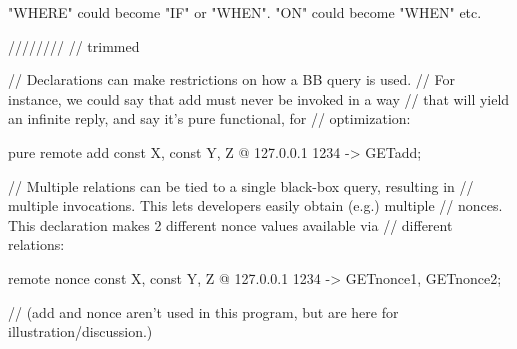"WHERE" could become "IF" or "WHEN".
"ON" could become "WHEN" 
etc.



////////
// trimmed


  // Declarations can make restrictions on how a BB query is used. 
  // For instance, we could say that add must never be invoked in a way
  // that will yield an infinite reply, and say it's pure functional, for 
  // optimization:

  pure remote add {const X, const Y, Z} @ 127.0.0.1 1234 -> 
    GETadd;

  // Multiple relations can be tied to a single black-box query, resulting in
  // multiple invocations. This lets developers easily obtain (e.g.) multiple
  // nonces. This declaration makes 2 different nonce values available via
  // different relations:

  remote nonce {const X, const Y, Z} @ 127.0.0.1 1234 -> 
    GETnonce1, GETnonce2;

  // (add and nonce aren't used in this program, but are here for illustration/discussion.)
